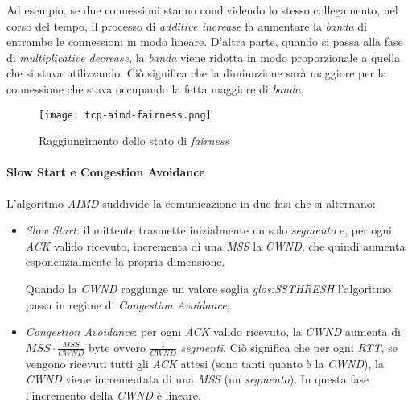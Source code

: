 Ad esempio, se due connessioni stanno condividendo lo stesso collegamento,
nel corso del tempo, il processo di \emph{additive increase} fa aumentare la
\emph{banda} di entrambe le connessioni in modo lineare. D'altra parte, quando
si passa alla fase di \emph{multiplicative decrease}, la \emph{banda} viene
ridotta in modo proporzionale a quella che si stava utilizzando. Ciò significa
che la diminuzione sarà maggiore per la connessione che stava occupando la
fetta maggiore di \emph{banda}.

\begin{figure}[h!]
    \centering
    \texttt{[image: tcp-aimd-fairness.png]}
    \caption{Raggiungimento dello stato di \emph{fairness}}
\end{figure}

\paragraph{Slow Start e Congestion Avoidance}
L'algoritmo \emph{AIMD} suddivide la comunicazione in due fasi che si alternano:
\begin{itemize}
    \item \emph{Slow Start}: il mittente trasmette inizialmente un solo
    \emph{segmento} e, per ogni \emph{ACK} valido ricevuto, incrementa di una
    \emph{MSS} la \emph{CWND}, che quindi aumenta esponenzialmente la propria
    dimensione.

    Quando la \emph{CWND} raggiunge un valore soglia \emph{\gls{glos:SSTHRESH}}
    l'algoritmo passa in regime di \emph{Congestion Avoidance};
    \item \emph{Congestion Avoidance}: per ogni \emph{ACK} valido ricevuto, la
    \emph{CWND} aumenta di $MSS\cdot\frac{MSS}{CWND}$ byte ovvero $\frac{1}{CWND}$
    \emph{segmenti}. Ciò significa che per ogni \emph{RTT}, se vengono ricevuti
    tutti gli \emph{ACK} attesi (sono tanti quanto è la \emph{CWND}), la
    \emph{CWND} viene incrementata di una \emph{MSS} (un \emph{segmento}).
    In questa fase l'incremento della \emph{CWND} è lineare.
\end{itemize}

